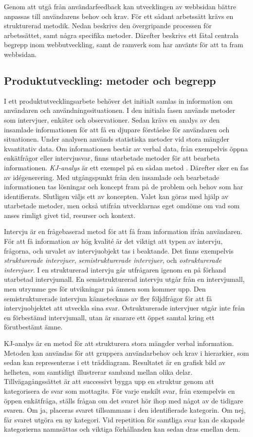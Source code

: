 Genom att utgå från användarfeedback kan utvecklingen av webbsidan bättre anpassas till användarens behov och krav. För ett sådant arbetssätt krävs en strukturerad metodik. Nedan beskrivs den övergripande processen för arbetssättet, samt några specifika metoder. Därefter beskrivs ett fåtal centrala begrepp inom webbutveckling, samt de ramverk som har använts för att ta fram webbsidan. 


\subsection{Produktutveckling: metoder och begrepp}
I ett produktutvecklingsarbete behöver det initialt samlas in information om användaren och användningssituationen. I den initiala fasen används metoder som intervjuer, enkäter och observationer. Sedan krävs en analys av den insamlade informationen för att få en djupare förståelse för användaren och situationen. Under analysen används statistiska metoder vid stora mängder kvantitativ data. Om informationen består av verbal data, från exempelvis öppna enkätfrågor eller intervjusvar, finns utarbetade metoder för att bearbeta informationen. \emph{KJ-analys} är ett exempel på en sådan metod \cite{kj}. Därefter sker en fas av idégenerering. Med utgångspunkt från den insamlade och bearbetade informationen tas lösningar och koncept fram på de problem och behov som har identifierats. Slutligen väljs ett av koncepten. Valet kan göras med hjälp av utarbetade metoder, men också utifrån utvecklarnas eget omdöme om vad som anses rimligt givet tid, resurser och kontext. 

Intervju är en frågebaserad metod för att få fram information ifrån användaren. För att få information av hög kvalité är det viktigt att typen av intervju, frågorna, och urvalet av intervjuobjekt tas i beaktande. Det finns exempelvis \emph{strukturerade intervjuer}, \emph{semistrukturerade intervjuer}, och \emph{ostrukturerade intervjuer}. I en strukturerad intervju går utfrågaren igenom en på förhand utarbetad intervjumall. En semistrukturerad intervju utgår från en intervjumall, men utrymme ges för utvikningar på ämnen som kommer upp. Den semistrukturerade intervjun kännetecknas av fler följdfrågor för att få intervjuobjektet att utveckla sina svar. Ostrukturerade intervjuer utgår inte från en förbestämd intervjumall, utan är snarare ett öppet samtal kring ett förutbestämt ämne. 

KJ-analys är en metod för att strukturera stora mängder verbal information. Metoden kan användas för att gruppera användarbehov och krav i hierarkier, som sedan kan representeras i ett träddiagram. Resultatet är en grafisk bild av helheten, som samtidigt illustrerar samband mellan olika delar. Tillvägagångssättet är att successivt bygga upp en struktur genom att kategorisera de svar som mottagits. För varje enskilt svar, från exempelvis en öppen enkätfråga, ställs frågan om det svaret hör ihop med något av de tidigare svaren. Om ja, placeras svaret tillsammans i den identifierade kategorin. Om nej, får svaret utgöra en ny kategori. Vid repetition för samtliga svar kan de skapade kategorierna namnsättas och viktiga förhållanden kan sedan dras emellan dem. 

